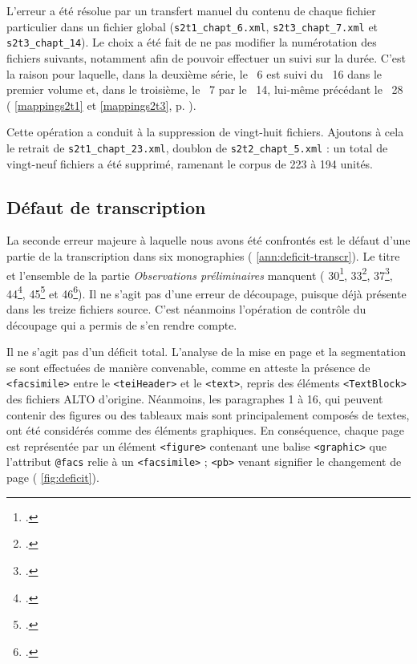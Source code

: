 L'erreur a été résolue par un transfert manuel du contenu de chaque fichier particulier dans un fichier global (\texttt{s2t1\_chapt\_6.xml}, \texttt{s2t3\_chapt\_7.xml} et \texttt{s2t3\_chapt\_14}). Le choix a été fait de ne pas modifier la numérotation des fichiers suivants, notamment afin de pouvoir effectuer un suivi sur la durée. C'est la raison pour laquelle, dans la deuxième série, le \no{}~6 est suivi du \no{}~16 dans le premier volume et, dans le troisième, le  \no{}~7 par le \no{}~14, lui-même précédant le \no{}~28 (\ann{} \ref{mappings2t1} et \ref{mappings2t3}, p. \pageref{mappings2t1}).

Cette opération a conduit à la suppression de vingt-huit fichiers. Ajoutons à cela le retrait de \texttt{s2t1\_chapt\_23.xml}, doublon de \texttt{s2t2\_chapt\_5.xml} : un total de vingt-neuf fichiers a été supprimé, ramenant le corpus de 223 à 194 unités.

\subsection{Défaut de transcription}

La seconde erreur majeure à laquelle nous avons été confrontés est le défaut d'une partie de la transcription dans six monographies (\ann{} \ref{ann:deficit-transcr}). Le titre et l'ensemble de la partie \textit{Observations préliminaires} manquent (\no{} 30\footcite{mono030a}, 33\footcite{mono033a}, 37\footcite{mono037a}, 44\footcite{mono044a}, 45\footcite{mono045a} et 46\footcite{mono046a}). Il ne s'agit pas d'une erreur de découpage, puisque déjà présente dans les treize fichiers source. C'est néanmoins l'opération de contrôle du découpage qui a permis de s'en rendre compte.

Il ne s'agit pas d'un déficit total. L'analyse de la mise en page et la segmentation se sont effectuées de manière convenable, comme en atteste la présence de \texttt{<facsimile>} entre le \texttt{<teiHeader>} et le \texttt{<text>}, repris des éléments \texttt{<TextBlock>} des fichiers ALTO d'origine. Néanmoins, les paragraphes 1 à 16, qui peuvent contenir des figures ou des tableaux mais sont principalement composés de textes, ont été considérés comme des éléments graphiques. En conséquence, chaque page est représentée par un élément \texttt{<figure>} contenant une balise \texttt{<graphic>} que l'attribut \texttt{@facs} relie à un \texttt{<facsimile>} ; \texttt{<pb>} venant signifier le changement de page (\fig{} \ref{fig:deficit}).

